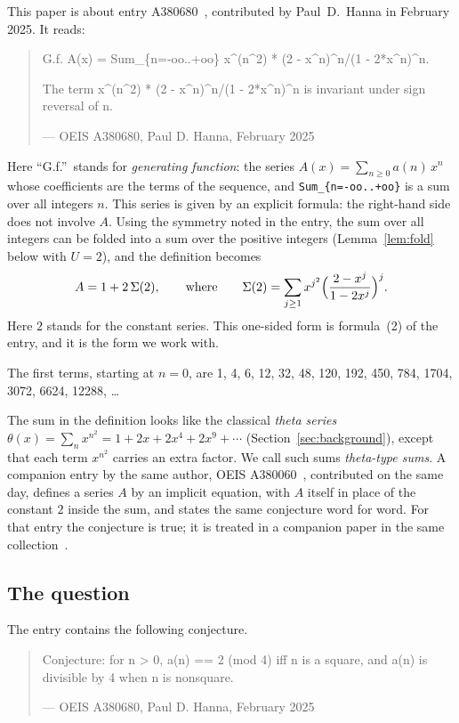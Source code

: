 \documentclass[11pt,a4paper]{article}
\theoremstyle{definition}
\theoremstyle{remark}
\begin{document}
This paper is about entry A380680~\cite{oeis}, contributed by Paul~D.~Hanna in February 2025. It reads:
\begin{quote}\small\ttfamily\raggedright G.f. A(x) = Sum\_\{n=-oo..+oo\} x\^{}(n\^{}2) * (2 - x\^{}n)\^{}n/(1 - 2*x\^{}n)\^{}n.\par\smallskip The term x\^{}(n\^{}2) * (2 - x\^{}n)\^{}n/(1 - 2*x\^{}n)\^{}n is invariant under sign reversal of n.\par\smallskip\hfill\textrm{--- OEIS A380680, Paul D. Hanna, February 2025}\end{quote}

Here ``G.f.''\ stands for \emph{generating function}: the series $A(x)=\sum_{n\ge0}a(n)\,x^n$ whose coefficients are
the terms of the sequence, and \texttt{Sum\_\{n=-oo..+oo\}} is a sum over all integers $n$. This series is given by an explicit formula: the right-hand side does not involve $A$. Using the symmetry
noted in the entry, the sum over all integers can be folded into a sum over the positive integers
(Lemma~\ref{lem:fold} below with $U=2$), and the definition becomes
\begin{equation}\label{eq:def}
A=1+2\,\Sigma(2),\qquad\text{where}\qquad
\Sigma(2)=\sum_{j\ge1}x^{j^2}\Bigl(\frac{2-x^j}{1-2x^j}\Bigr)^{j}.
\end{equation}
Here $2$ stands for the constant series. This one-sided form is formula~(2) of the entry, and it is the form we work
with.

The first terms, starting at $n=0$, are 1, 4, 6, 12, 32, 48, 120, 192, 450, 784, 1704, 3072, 6624, 12288, \dots{}

The sum in the definition looks like the classical \emph{theta series} $\theta(x)=\sum_nx^{n^2}=1+2x+2x^4+2x^9+\cdots$
(Section~\ref{sec:background}), except that each term $x^{n^2}$ carries an extra factor. We call such sums
\emph{theta-type sums}. A companion entry by the same author, OEIS A380060~\cite{oeisother}, contributed on
the same day, defines a series $A$ by an implicit equation, with $A$ itself in place of the constant $2$ inside the sum,
and states the same conjecture word for word. For that entry the conjecture is true; it is treated in a companion
paper in the same collection~\cite{repo}.

\subsection{The question}
The entry contains the following conjecture.
\begin{quote}\small\ttfamily\raggedright Conjecture: for n > 0, a(n) == 2 (mod 4) iff n is a square, and a(n) is divisible by 4 when n is nonsquare.\par\smallskip\hfill\textrm{--- OEIS A380680, Paul D. Hanna, February 2025}\end{quote}
\end{document}
